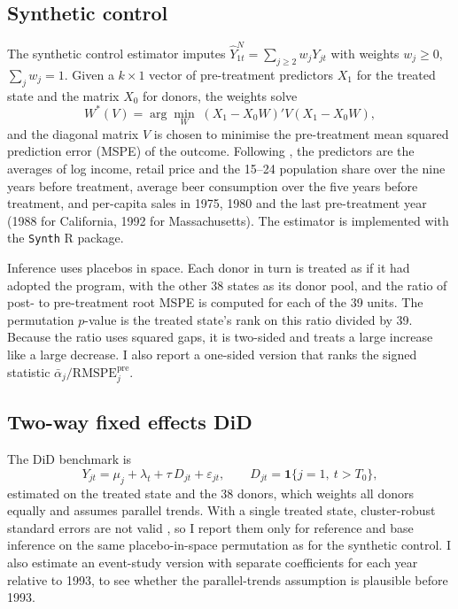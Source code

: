 \documentclass[11pt]{article}
\begin{document}
\subsection{Synthetic control}
The synthetic control estimator \citep{abadie2003, adh2010} imputes
$\hat Y_{1t}^N = \sum_{j\ge 2} w_j Y_{jt}$ with weights $w_j \ge 0$,
$\sum_j w_j = 1$. Given a $k\times 1$ vector of pre-treatment predictors
$X_1$ for the treated state and the matrix $X_0$ for donors, the weights solve
\begin{equation}
  W^*(V) = \arg\min_{W}\; (X_1 - X_0W)'V(X_1 - X_0W),
\end{equation}
and the diagonal matrix $V$ is chosen to minimise the pre-treatment mean
squared prediction error (MSPE) of the outcome. Following \citet{adh2010}, the
predictors are the averages of log income, retail price and the 15--24
population share over the nine years before treatment, average beer
consumption over the five years before treatment, and per-capita sales in 1975,
1980 and the last pre-treatment year (1988 for California, 1992 for
Massachusetts). The estimator is implemented with the \texttt{Synth} R package.

Inference uses placebos in space. Each donor in turn is treated as if it had
adopted the program, with the other 38 states as its donor pool, and the
ratio of post- to pre-treatment root MSPE is computed for each of the 39
units. The permutation $p$-value is the treated state's rank on this ratio
divided by 39. Because the ratio uses squared gaps, it is two-sided and treats a
large increase like a large decrease. I also report a one-sided version that
ranks the signed statistic $\bar\alpha_j/\mathrm{RMSPE}_j^{\text{pre}}$.

\subsection{Two-way fixed effects DiD}
The DiD benchmark is
\begin{equation}
  Y_{jt} = \mu_j + \lambda_t + \tau\, D_{jt} + \varepsilon_{jt},
  \qquad D_{jt} = \mathbf 1\{j = 1,\ t > T_0\},
\end{equation}
estimated on the treated state and the 38 donors, which weights all donors
equally and assumes parallel trends. With a single treated state,
cluster-robust standard errors are not valid \citep{conley2011}, so I report
them only for reference and base inference on the same placebo-in-space
permutation as for the synthetic control. I also estimate an event-study
version with separate coefficients for each year relative to 1993, to see
whether the parallel-trends assumption is plausible before 1993.
\end{document}
